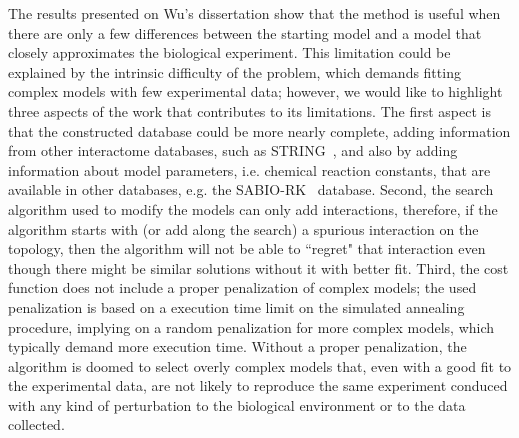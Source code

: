 The results presented on Wu's dissertation show that the method is 
useful when there are only a few differences between the starting model
and a model that closely approximates the biological experiment. This
limitation could be explained by the intrinsic difficulty of the 
problem, which demands fitting complex models with few experimental 
data; however, we would like to highlight three aspects of the work that 
contributes to its limitations. The first aspect is that the constructed 
database could be more nearly complete, adding information from other 
interactome databases, such as STRING~\cite{Szklarczyk2010}, and also by 
adding information about model parameters, i.e. chemical reaction 
constants, that are available in other databases, e.g. the 
SABIO-RK~\cite{Wittig2011} database. Second, the search algorithm used
to modify the models can only add interactions, therefore, if the 
algorithm starts with (or add along the search) a spurious interaction 
on the topology, then the algorithm will not be able to ``regret" that 
interaction even though there might be similar solutions without it with 
better fit. Third, the cost function does not include a proper 
penalization of complex models; the used penalization is based on a 
execution time limit on the simulated annealing procedure, implying on a 
random penalization for more complex models, which typically demand more 
execution time. Without a proper penalization, the algorithm is doomed 
to select overly complex models that, even with a good fit to the 
experimental data, are not likely to reproduce the same experiment
conduced with any kind of perturbation to the biological environment or 
to the data collected.

